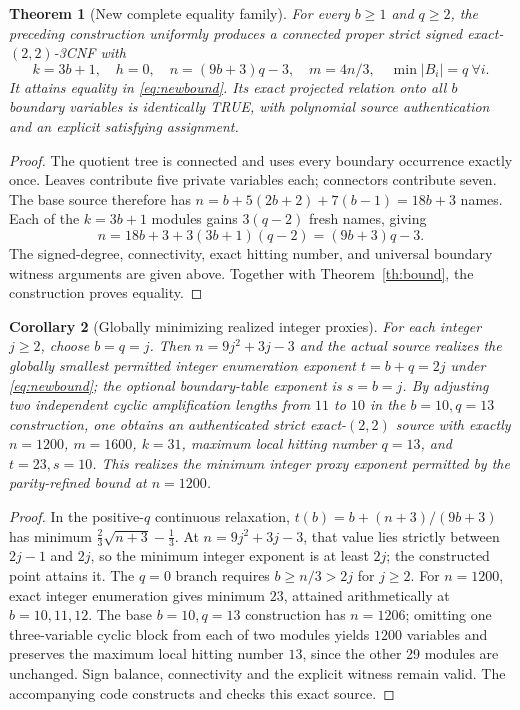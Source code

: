 \documentclass[11pt]{article}
\newtheorem{theorem}{Theorem}
\newtheorem{corollary}[theorem]{Corollary}
\begin{document}
\begin{theorem}[New complete equality family]\label{th:family}
For every $b\ge1$ and $q\ge2$, the preceding construction uniformly produces a connected proper strict signed exact-$(2,2)$-3CNF with
\begin{equation}\label{eq:exact}
 \boxed{k=3b+1,\quad h=0,\quad n=(9b+3)q-3,\quad m=4n/3,\quad \min|B_i|=q\ \forall i.}
\end{equation}
It attains equality in \eqref{eq:newbound}. Its exact projected relation onto all $b$ boundary variables is identically TRUE, with polynomial source authentication and an explicit satisfying assignment.
\end{theorem}
\begin{proof}
The quotient tree is connected and uses every boundary occurrence exactly once. Leaves contribute five private variables each; connectors contribute seven. The base source therefore has $n=b+5(2b+2)+7(b-1)=18b+3$ names. Each of the $k=3b+1$ modules gains $3(q-2)$ fresh names, giving
\[
 n=18b+3+3(3b+1)(q-2)=(9b+3)q-3.
\]
The signed-degree, connectivity, exact hitting number, and universal boundary witness arguments are given above. Together with Theorem~\ref{th:bound}, the construction proves equality.
\end{proof}

\begin{corollary}[Globally minimizing realized integer proxies]\label{cor:optimum}
For each integer $j\ge2$, choose $b=q=j$. Then $n=9j^2+3j-3$ and the actual source realizes the globally smallest \emph{permitted integer enumeration exponent} $t=b+q=2j$ under \eqref{eq:newbound}; the optional boundary-table exponent is $s=b=j$. By adjusting two independent cyclic amplification lengths from $11$ to $10$ in the $b=10,q=13$ construction, one obtains an authenticated strict exact-$(2,2)$ source with \emph{exactly} $n=1200$, $m=1600$, $k=31$, maximum local hitting number $q=13$, and $t=23,s=10$. This realizes the minimum integer proxy exponent permitted by the parity-refined bound at $n=1200$.
\end{corollary}
\begin{proof}
In the positive-$q$ continuous relaxation, $t(b)=b+(n+3)/(9b+3)$ has minimum $\frac23\sqrt{n+3}-\frac13$. At $n=9j^2+3j-3$, that value lies strictly between $2j-1$ and $2j$, so the minimum integer exponent is at least $2j$; the constructed point attains it. The $q=0$ branch requires $b\ge n/3>2j$ for $j\ge2$. For $n=1200$, exact integer enumeration gives minimum $23$, attained arithmetically at $b=10,11,12$. The base $b=10,q=13$ construction has $n=1206$; omitting one three-variable cyclic block from each of two modules yields $1200$ variables and preserves the maximum local hitting number $13$, since the other 29 modules are unchanged. Sign balance, connectivity and the explicit witness remain valid. The accompanying code constructs and checks this exact source.
\end{proof}
\end{document}
